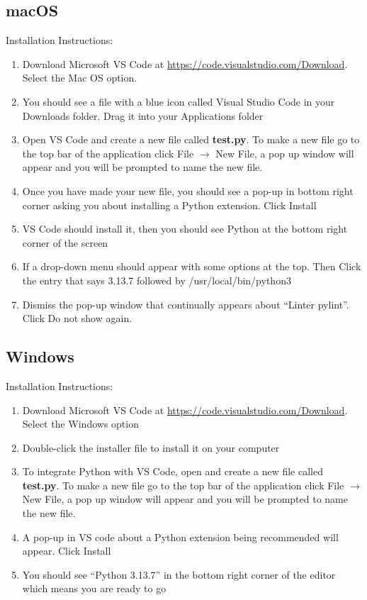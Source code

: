 \documentclass[12pt]{article}
\begin{document}
\subsection{macOS}
Installation Instructions: 
\begin{enumerate}
\item Download Microsoft VS Code at \url{https://code.visualstudio.com/Download}. Select the Mac OS option.
\item You should see a file with a blue icon called Visual Studio Code in your Downloads folder. Drag it into your Applications folder
\item Open VS Code and create a new file called \textbf{test.py}. To make a new file go to the top bar of the application click File $\rightarrow$ New File, a pop up window will appear and you will be prompted to name the new file.
  \item Once you have made your new file, you should see a pop-up in bottom right corner asking you about installing a Python extension. Click Install
\item VS Code should install it, then you should see Python at the bottom right corner of the screen
\item If a drop-down menu should appear with some options at the top. Then Click the entry that says 3.13.7 followed by /usr/local/bin/python3
\item Dismiss the pop-up window that continually appears about ``Linter pylint''. Click Do not show again.
\end{enumerate}

\subsection{Windows}
Installation Instructions: 
\begin{enumerate}
\item Download Microsoft VS Code at \url{https://code.visualstudio.com/Download}. Select the Windows option
\item Double-click the installer file to install it on your computer
\item To integrate Python with VS Code, open and create a new file called \textbf{test.py}. To make a new file go to the top bar of the application click File $\rightarrow$ New File, a pop up window will appear and you will be prompted to name the new file.
\item A pop-up in VS code about a Python extension being recommended will appear. Click Install
\item You should see ``Python 3.13.7'' in the bottom right corner of the editor which means you are ready to go
\end{enumerate}
\end{document}
